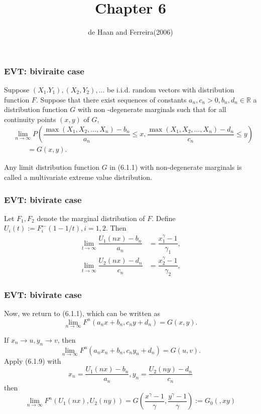 \documentclass{beamer}
\author{de Haan and Ferreira(2006)}
\title{Chapter 6}
\date{}
\newcommand{\suit}[1]{\left(#1\right)}
\begin{document}
\begin{frame}
\titlepage
\end{frame}

\begin{frame}
    \frametitle{EVT: biviraite case}
Suppose $(X_1.Y_1), (X_2,Y_2),\dots$ be i.i.d. random vectors with distribution function $F$. Suppose that there exist sequences of constants $a_n,c_n>0, b_n,d_n \in \mathbb{R}$ a distribution function $G$ with non -degenerate marginals such that for all continuity points $(x,y)$ of $G$,
\begin{equation}\tag{6.1.1}
    \begin{aligned}
        &\lim_{n \to \infty}P(\dfrac{\max\suit{X_1,X_2,\dots,X_n}-b_n}{a_n}\le x,\dfrac{\max\suit{X_1,X_2,\dots,X_n}-d_n}{c_n}\le y)   \\
        &\quad\quad =G(x,y).
    \end{aligned}
\end{equation}

Any limit distribution function $G$ in (6.1.1) with non-degenerate marginals is called a multivariate extreme value distribution.
\end{frame}



\begin{frame}
    \frametitle{EVT: bivirate case}
Let $F_1,F_2$ denote the marginal distribution of $F$. Define $U_i(t):=F_i^{\leftarrow}(1-1/t), i=1,2.$ Then
\begin{equation}
    \begin{aligned}
        \lim_{t\to \infty} \dfrac{U_1(nx)-b_n}{a_n} & =\dfrac{x^{\gamma}_1-1}{\gamma_1},      \\
        \lim_{t\to \infty} \dfrac{U_2(nx)-d_n}{c_n} & =\dfrac{x^{\gamma}_2-1}{\gamma_2},   
    \end{aligned}
\end{equation}
\end{frame}

\begin{frame}
    \frametitle{EVT: bivirate case}
    Now, we return to (6.1.1), which can be written as 
\begin{equation}\tag{6.1.8}
    \lim_{n \to \infty} F^n (a_n x+b_n, c_ny+d_n)=G(x,y).
\end{equation}
 
If $x_n \to u, y_n \to v$, then 
\begin{equation}\tag{6.1.9}
    \lim_{n \to \infty} F^n (a_n x_n+b_n, c_ny_n+d_n)=G(u,v).
\end{equation}
Apply (6.1.9) with 
$$
x_n=\dfrac{U_1(nx)-b_n}{a_n},y_n=\dfrac{U_2(ny)-d_n}{c_n}
$$
then 
$$
\lim_{n\to \infty} F^n (U_1(nx),U_2(ny))=G\suit{\dfrac{x^{\gamma}-1}{\gamma},\dfrac{y^{\gamma}-1}{\gamma}}:=G_0(,xy)
$$
\end{frame}
\end{document}
